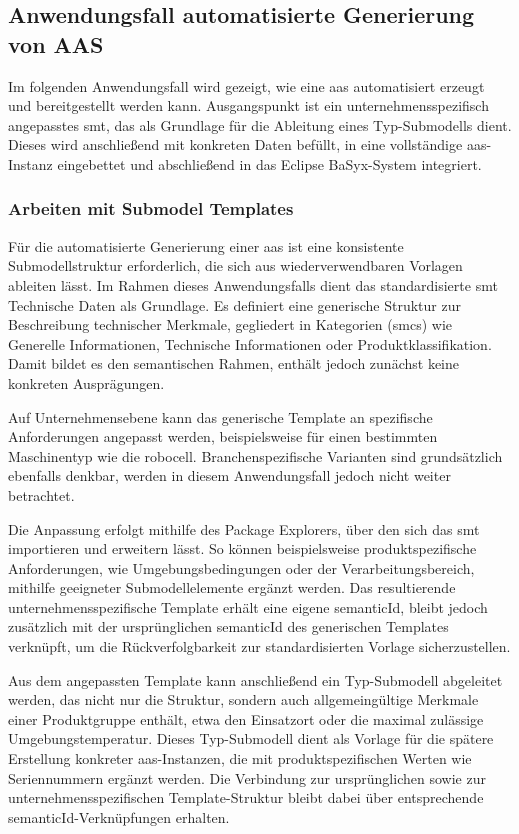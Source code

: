 \subsection{Anwendungsfall automatisierte Generierung von AAS}
Im folgenden Anwendungsfall wird gezeigt, wie eine \acs{aas} automatisiert erzeugt und bereitgestellt werden kann.  
Ausgangspunkt ist ein unternehmensspezifisch angepasstes \acs{smt}, das als Grundlage für die Ableitung eines Typ-Submodells dient.  
Dieses wird anschließend mit konkreten Daten befüllt, in eine vollständige \acs{aas}-Instanz eingebettet und abschließend in das Eclipse BaSyx-System integriert.

\subsubsection{Arbeiten mit Submodel Templates}
\label{chap:ErstellenvonSubmodelTemplates}
Für die automatisierte Generierung einer \acs{aas} ist eine konsistente Submodellstruktur erforderlich, die sich aus wiederverwendbaren Vorlagen ableiten lässt.
Im Rahmen dieses Anwendungsfalls dient das standardisierte \acs{smt} Technische Daten \cite{SpezifikaitonTechnischeDaten} als Grundlage. 
Es definiert eine generische Struktur zur Beschreibung technischer Merkmale, gegliedert in Kategorien (\acsp{smc}) wie Generelle Informationen, Technische Informationen oder Produktklassifikation. 
Damit bildet es den semantischen Rahmen, enthält jedoch zunächst keine konkreten Ausprägungen.

Auf Unternehmensebene kann das generische Template an spezifische Anforderungen angepasst werden, beispielsweise für einen bestimmten Maschinentyp wie die robocell.
Branchenspezifische Varianten sind grundsätzlich ebenfalls denkbar, werden in diesem Anwendungsfall jedoch nicht weiter betrachtet.

Die Anpassung erfolgt mithilfe des Package Explorers, über den sich das \acs{smt} importieren und erweitern lässt.
So können beispielsweise produktspezifische Anforderungen, wie Umgebungsbedingungen oder der Verarbeitungsbereich, mithilfe geeigneter Submodell\-elemente ergänzt werden.
Das resultierende unternehmensspezifische Template erhält eine eigene semanticId, bleibt jedoch zusätzlich mit der ursprünglichen semanticId des generischen Templates verknüpft, um die Rückverfolgbarkeit zur standardisierten Vorlage sicherzustellen.

Aus dem angepassten Template kann anschließend ein Typ-Submodell abgeleitet werden, das nicht nur die Struktur, sondern auch allgemeingültige Merkmale einer Produktgruppe enthält, etwa den Einsatzort oder die maximal zulässige Umgebungstemperatur.
Dieses Typ-Submodell dient als Vorlage für die spätere Erstellung konkreter \acs{aas}-Instanzen, die mit produktspezifischen Werten wie Seriennummern ergänzt werden.
Die Verbindung zur ursprünglichen sowie zur unternehmensspezifischen Template-Struktur bleibt dabei über entsprechende semanticId-Verknüpfungen erhalten.

